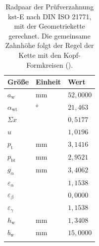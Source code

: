 \begin{table}[htbp]
    \caption{Radpaar der Prüfverzahnung kst-E nach DIN ISO 21771, mit der Geometriekette gerechnet. Die gemeinsame Zahnhöhe folgt der Regel der Kette mit den Kopf-Formkreisen ().}
    \label{tab:anhang_radpaar_kste}
    \centering
    \footnotesize
    \setlength{\tabcolsep}{4pt}
    \begin{tabular}{L{6.2cm}ll}
        Größe & Einheit & Wert \\
        \hline
        $a_{\mathrm{w}}$ & mm & $52{,}0000$ \\
        \hline
        $\alpha_{\mathrm{wt}}$ & ° & $21{,}463$ \\
        \hline
        $\Sigma x$ &  & $0{,}5177$ \\
        \hline
        $u$ &  & $1{,}0196$ \\
        \hline
        $p_{\mathrm{t}}$ & mm & $3{,}1416$ \\
        \hline
        $p_{\mathrm{bt}}$ & mm & $2{,}9521$ \\
        \hline
        $g_{\alpha}$ & mm & $3{,}4062$ \\
        \hline
        $\varepsilon_{\alpha}$ &  & $1{,}1538$ \\
        \hline
        $\varepsilon_{\beta}$ &  & $0{,}0000$ \\
        \hline
        $\varepsilon_{\gamma}$ &  & $1{,}1538$ \\
        \hline
        $h_{\mathrm{w}}$ & mm & $1{,}3408$ \\
        \hline
        $b_{\mathrm{w}}$ & mm & $15{,}0000$ \\
        \hline
    \end{tabular}
\end{table}
